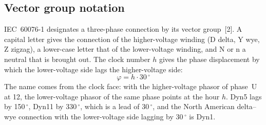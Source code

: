 \subsection{Vector group notation}
\label{sec:de-vector}

IEC~60076-1 designates a three-phase connection by its vector
group~[2]. A capital letter gives the connection of the
higher-voltage winding (D delta, Y wye, Z zigzag), a lower-case letter that
of the lower-voltage winding, and N or n a neutral that is brought out. The
clock number $h$ gives the phase displacement by which the lower-voltage
side lags the higher-voltage side:
\begin{equation}
  \varphi = h \cdot 30\,^{\circ}
  \label{eq:de-clock}
\end{equation}
The name comes from the clock face: with the higher-voltage phasor of
phase~U at 12, the lower-voltage phasor of the same phase points at the
hour $h$. Dyn5 lags by 150\,$^{\circ}$, Dyn11 by 330\,$^{\circ}$, which is
a lead of 30\,$^{\circ}$, and the North American delta--wye connection with
the lower-voltage side lagging by 30\,$^{\circ}$ is Dyn1.
\FloatBarrier

